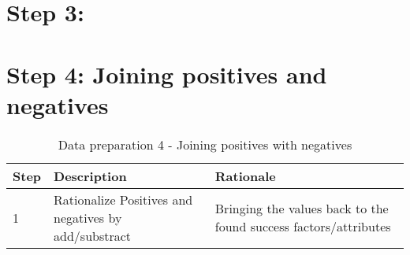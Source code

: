 \section{Step 3:}



\section{Step 4: Joining positives and negatives}

\begin{table}[htbp]
	\centering
	\begin{tabular}{p{}p{}p{}}
		\toprule
		\textbf{Step} & \textbf{Description} & \textbf{Rationale} \\
		\midrule
		1     & Rationalize Positives and negatives by add/substract & Bringing the values back to the found success factors/attributes \\
		\bottomrule
	\end{tabular}%
	\caption{Data preparation 4 - Joining positives with negatives}
	\label{tab:prepjoinpositiveswithnegatives}%
\end{table}%

